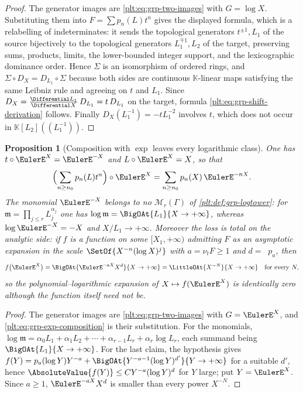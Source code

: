 \documentclass[11pt,oneside]{article}
\theoremstyle{plain}
\newtheorem{proposition}[theorem]{Proposition}
\theoremstyle{definition}
\theoremstyle{remark}
\newcommand{\K}{\mathbb{K}}
\newcommand{\ordt}{\nu_{t}}                              %
\DeclareMathOperator{\degL}{deg_{L}}
\newcommand{\DX}{D_{X}}                                  %
\newcommand{\compose}{\mathbin{\circ}}
\begin{document}
\begin{proof}
The generator images are \eqref{plt:eq:grp-two-images} with \(G=\log X\).
Substituting them into \(F=\sum p_n(L)t^n\) gives the displayed formula, which
is a relabelling of indeterminates: it sends the topological generators
\(t^{\pm1},L_1\) of the source bijectively to the topological generators
\(L_1^{\mp1},L_2\) of the target, preserving sums, products, limits, the
lower-bounded integer support, and the lexicographic dominance order.  Hence
\(\Sigma\) is an isomorphism of ordered rings, and
\(\Sigma\circ\DX=D_{L_1}\circ\Sigma\) because both sides are continuous
\(\K\)-linear maps satisfying the same Leibniz rule and agreeing on \(t\) and
\(L_1\).  Since
\(\DX=\frac{\Differential L_1}{\Differential X}\,D_{L_1}=t\,D_{L_1}\) on the
target, formula \eqref{plt:eq:grp-shift-derivation} follows.  Finally
\(\DX(L_1^{-1})=-tL_1^{-2}\) involves \(t\), which does not occur in
\(\K[L_2]((L_1^{-1}))\).
\end{proof}

\begin{proposition}[Composition with \(\exp\) leaves every logarithmic class]
\label{plt:prop:grp-exponential}
One has \(t\compose\EulerE^{X}=\EulerE^{-X}\) and
\(L\compose\EulerE^{X}=X\), so that
\begin{equation}\label{plt:eq:grp-exp-composition}
  \Bigl(\sum_{n\ge n_0}p_n(L)t^n\Bigr)\compose\EulerE^{X}
  =\sum_{n\ge n_0}p_n(X)\,\EulerE^{-nX}.
\end{equation}
The monomial \(\EulerE^{-X}\) belongs to no \(\mathcal M_r(\Gamma)\) of
\cref{plt:def:grp-logtower}: for
\(\mathfrak m=\prod_{j\le r}L_j^{\alpha_j}\) one has
\(\log\mathfrak m=\BigOAt{L_1}{X\to+\infty}\), whereas
\(\log\EulerE^{-X}=-X\) and \(X/L_1\to+\infty\).  Moreover the loss is total on
the analytic side: if \(f\) is a function on some \([X_1,+\infty)\) admitting
\(F\) as an asymptotic expansion in the scale \(\SetOf{X^{-n}(\log X)^j}\) with
\(a=\ordt F\ge1\) and \(d=\degL p_a\), then
\begin{equation}\label{plt:eq:grp-exp-collapse}
  f\bigl(\EulerE^{X}\bigr)
  =\BigOAt{\EulerE^{-aX}X^{d}}{X\to+\infty}
  =\LittleOAt{X^{-N}}{X\to+\infty}
  \quad\text{for every }N,
\end{equation}
so the polynomial--logarithmic expansion of \(X\mapsto f(\EulerE^{X})\) is
identically zero although the function itself need not be.
\end{proposition}

\begin{proof}
The generator images are \eqref{plt:eq:grp-two-images} with \(G=\EulerE^{X}\),
and \eqref{plt:eq:grp-exp-composition} is their substitution.  For the
monomials, \(\log\mathfrak m=\alpha_0L_1+\alpha_1L_2+\cdots+\alpha_{r-1}L_r
+\alpha_r\log L_r\), each summand being \(\BigOAt{L_1}{X\to+\infty}\).  For the
last claim, the hypothesis gives \(f(Y)=p_a(\log Y)Y^{-a}
 +\BigOAt{Y^{-a-1}(\log Y)^{d'}}{Y\to+\infty}\) for a suitable \(d'\), hence
\(\AbsoluteValue{f(Y)}\le CY^{-a}(\log Y)^{d}\) for \(Y\) large; put
\(Y=\EulerE^{X}\).  Since \(a\ge1\), \(\EulerE^{-aX}X^{d}\) is smaller than
every power \(X^{-N}\).
\end{proof}
\end{document}
